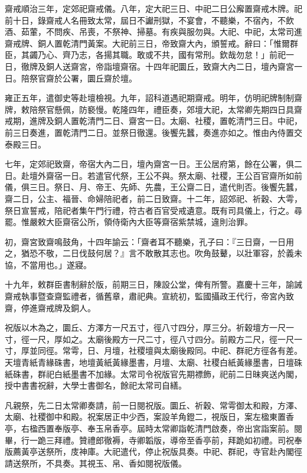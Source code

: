 \begin{pinyinscope}
齋戒順治三年，定郊祀齋戒儀。八年，定大祀三日、中祀二日公廨置齋戒木牌。祀前十日，錄齋戒人名冊致太常，屆日不讞刑獄，不宴會，不聽樂，不宿內，不飲酒、茹葷，不問疾、吊喪，不祭神、掃墓。有疾與服勿與。大祀、中祀，太常司進齋戒牌、銅人置乾清門黃案。大祀前三日，帝致齋大內，頒誓戒。辭曰：「惟爾群臣，其蠲乃心、齊乃志，各揚其職。敢或不共，國有常刑。欽哉勿怠！」前祀一日，徹牌及銅人送齋宮，帝詣壇齋宿。十四年祀圜丘，致齋大內二日，壇內齋宮一日。陪祭官齋於公署，圜丘齋於壇。

雍正五年，遣御史等赴壇檢視。九年，詔科道遇祀期齋戒。明年，仿明祀牌制制齋牌，敕陪祭官懸佩，防褻慢。乾隆四年，禮臣奏，郊壇大祀，太常卿先期四日具齋戒期，進牌及銅人置乾清門二日、齋宮一日。太廟、社稷，置乾清門三日。中祀，前三日奏進，置乾清門二日。並祭日徹還。後饗先蠶，奏進亦如之。惟由內侍置交泰殿三日。

七年，定郊祀致齋，帝宿大內二日，壇內齋宮一日。王公居府第，餘在公署，俱二日。赴壇外齋宿一日。若遣官代祭，王公不與。祭太廟、社稷，王公百官齋所如前儀，俱三日。祭日、月、帝王、先師、先農，王公齋二日，遣代則否。後饗先蠶，齋二日，公主、福晉、命婦陪祀者，前二日致齋。十二年，詔郊祀、祈穀、大雩，祭日宣誓戒，陪祀者集午門行禮，符古者百官受戒遺意。既有司具儀上，行之。尋罷。惟嚴敕大臣齋宿公所，領侍衛內大臣等齋宿紫禁城，違則治罪。

初，齋宮致齋鳴鼓角，十四年諭云：「齋者耳不聽樂，孔子曰：『三日齋，一日用之，猶恐不敬，二日伐鼓何居？』言不敢散其志也。吹角鼓鼙，以壯軍容，於義未協，不當用也。」遂寢。

十九年，敕群臣書制辭於版，前期三日，陳設公堂，俾有所警。嘉慶十三年，諭誡齋戒執事暨查齋監禮者，循舊章，肅祀典。宣統初，監國攝政王代行，帝宮內致齋，停進齋戒牌及銅人。

祝版以木為之，圜丘、方澤方一尺五寸，徑八寸四分，厚三分。祈穀壇方一尺一寸，徑一尺，厚如之。太廟後殿方一尺二寸，徑八寸四分。前殿方二尺，徑一尺一寸，厚並同徑。常雩，日、月壇，社稷壇與太廟後殿同。中祀、群祀方徑各有差。天壇青紙青緣硃書，地壇黃紙黃緣墨書，月壇、太廟、社稷白紙黃緣墨書，日壇硃紙硃書，群祀白紙墨書不加緣。太常司令祝版官先期褾飾，祀前二日昧爽送內閣，授中書書祝辭，大學士書御名，餘祀太常司自繕。

凡親祭，先二日太常卿奏請，前一日閱祝版。圜丘、祈穀、常雩御太和殿，方澤、太廟、社稷御中和殿。祝案居正中少西，案設羊角鐙二，視版日，案左楹東置香亭，右楹西置奉版亭、奉玉帛香亭。屆時太常卿詣乾清門啟奏，帝出宮詣案前。閱畢，行一跪三拜禮。贊禮郎徹褥，寺卿韜版，導帝至香亭前，拜跪如初禮。司祝奉版薦黃亭送祭所，庋神庫。大祀遣代，停止祝版具奏。中祀、群祀，寺官赴內閣徑請送祭所，不具奏。其視玉、帛、香如閱祝版儀。


\end{pinyinscope}
